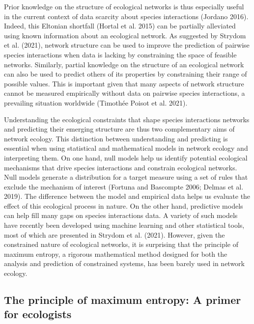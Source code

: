 \documentclass[10pt,oneside]{article}
\begin{document}
Prior knowledge on the structure of ecological networks is thus
especially useful in the current context of data scarcity about species
interactions (Jordano 2016). Indeed, this Eltonian shortfall (Hortal et
al. 2015) can be partially alleviated using known information about an
ecological network. As suggested by Strydom et al. (2021), network
structure can be used to improve the prediction of pairwise species
interactions when data is lacking by constraining the space of feasible
networks. Similarly, partial knowledge on the structure of an ecological
network can also be used to predict others of its properties by
constraining their range of possible values. This is important given
that many aspects of network structure cannot be measured empirically
without data on pairwise species interactions, a prevailing situation
worldwide (Timothée Poisot et al. 2021).

Understanding the ecological constraints that shape species interactions
networks and predicting their emerging structure are thus two
complementary aims of network ecology. This distinction between
understanding and predicting is essential when using statistical and
mathematical models in network ecology and interpreting them. On one
hand, null models help us identify potential ecological mechanisms that
drive species interactions and constrain ecological networks. Null
models generate a distribution for a target measure using a set of rules
that exclude the mechanism of interest (Fortuna and Bascompte 2006;
Delmas et al. 2019). The difference between the model and empirical data
helps us evaluate the effect of this ecological process in nature. On
the other hand, predictive models can help fill many gaps on species
interactions data. A variety of such models have recently been developed
using machine learning and other statistical tools, most of which are
presented in Strydom et al. (2021). However, given the constrained
nature of ecological networks, it is surprising that the principle of
maximum entropy, a rigorous mathematical method designed for both the
analysis and prediction of constrained systems, has been barely used in
network ecology.

\hypertarget{the-principle-of-maximum-entropy-a-primer-for-ecologists}{%
\subsection{The principle of maximum entropy: A primer for
ecologists}\label{the-principle-of-maximum-entropy-a-primer-for-ecologists}}
\end{document}
